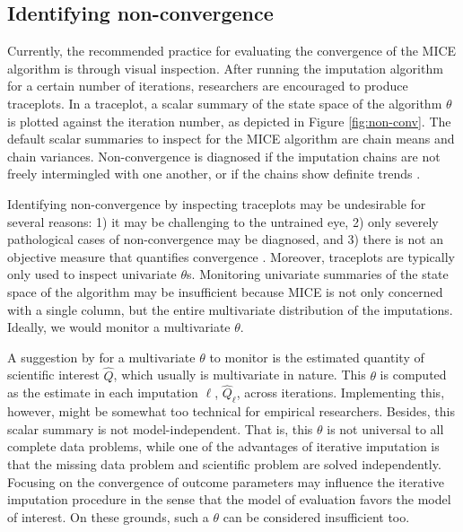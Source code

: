 \documentclass[Royal,times,sageh]{sagej}
\begin{document}
\hypertarget{identifying-non-convergence}{%
\subsection{Identifying non-convergence}\label{identifying-non-convergence}}

Currently, the recommended practice for evaluating the convergence of the MICE algorithm is through visual inspection. After running the imputation algorithm for a certain number of iterations, researchers are encouraged to produce traceplots. In a traceplot, a scalar summary of the state space of the algorithm \(\theta\) is plotted against the iteration number, as depicted in Figure \ref{fig:non-conv}. The default scalar summaries to inspect for the MICE algorithm are chain means and chain variances. Non-convergence is diagnosed if the imputation chains are not freely intermingled with one another, or if the chains show definite trends \citep{buur18}.

Identifying non-convergence by inspecting traceplots may be undesirable for several reasons: 1) it may be challenging to the untrained eye, 2) only severely pathological cases of non-convergence may be diagnosed, and 3) there is not an objective measure that quantifies convergence \citep[\(\S\) 6.5.2]{buur18}. Moreover, traceplots are typically only used to inspect univariate \(\theta\)s. Monitoring univariate summaries of the state space of the algorithm may be insufficient because MICE is not only concerned with a single column, but the entire multivariate distribution of the imputations. Ideally, we would monitor a multivariate \(\theta\).

A suggestion by \citet{buur18} for a multivariate \(\theta\) to monitor is the estimated quantity of scientific interest \(\hat{Q}\), which usually is multivariate in nature. This \(\theta\) is computed as the estimate in each imputation \(\ell\), \(\hat{Q}_\ell\), across iterations. Implementing this, however, might be somewhat too technical for empirical researchers. Besides, this scalar summary is not model-independent. That is, this \(\theta\) is not universal to all complete data problems, while one of the advantages of iterative imputation is that the missing data problem and scientific problem are solved independently. Focusing on the convergence of outcome parameters may influence the iterative imputation procedure in the sense that the model of evaluation favors the model of interest. On these grounds, such a \(\theta\) can be considered insufficient too.
\end{document}
